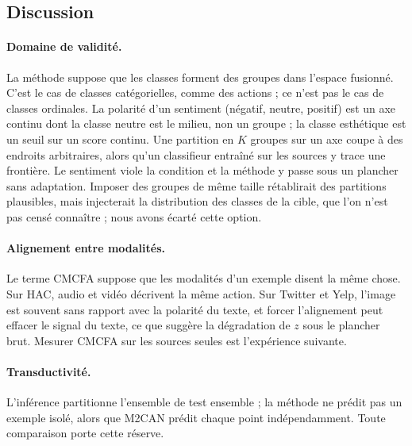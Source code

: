 \documentclass[11pt,a4paper]{article}
\theoremstyle{definition}
\theoremstyle{remark}
\begin{document}
\subsection{Discussion}\label{sec-discussion}

\paragraph{Domaine de validité.}
La méthode suppose que les classes forment des groupes dans l'espace fusionné. C'est le cas de classes catégorielles,
comme des actions ; ce n'est pas le cas de classes ordinales. La polarité d'un sentiment (négatif, neutre, positif)
est un axe continu dont la classe neutre est le milieu, non un groupe ; la classe esthétique est un seuil sur un score
continu. Une partition en $K$ groupes sur un axe coupe à des endroits arbitraires, alors qu'un classifieur entraîné sur
les sources y trace une frontière. Le sentiment viole la condition et la méthode y passe sous un plancher sans
adaptation. Imposer des groupes de même taille rétablirait des partitions plausibles, mais injecterait la distribution
des classes de la cible, que l'on n'est pas censé connaître ; nous avons écarté cette option.

\paragraph{Alignement entre modalités.}
Le terme CMCFA suppose que les modalités d'un exemple disent la même chose. Sur HAC, audio et vidéo décrivent la même
action. Sur Twitter et Yelp, l'image est souvent sans rapport avec la polarité du texte, et forcer l'alignement peut
effacer le signal du texte, ce que suggère la dégradation de $z$ sous le plancher brut. Mesurer CMCFA sur les sources
seules est l'expérience suivante.

\paragraph{Transductivité.}
L'inférence partitionne l'ensemble de test ensemble ; la méthode ne prédit pas un exemple isolé, alors que M2CAN prédit
chaque point indépendamment. Toute comparaison porte cette réserve.
\end{document}
